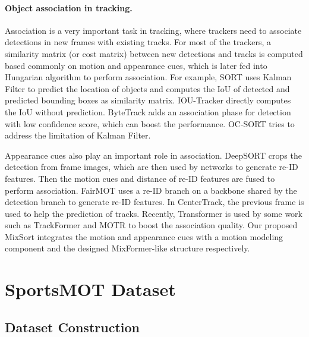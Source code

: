 \documentclass[10pt,twocolumn,letterpaper]{article}
\begin{document}
\vspace{-4mm}
\paragraph{Object association in tracking.}
Association is a very important task in tracking, where trackers need to associate detections in new frames with existing tracks. For most of the trackers, a similarity matrix (or cost matrix) between new detections and tracks is computed based commonly on motion and appearance cues, which is later fed into Hungarian algorithm\cite{kuhn1955hungarian} to perform association. For example, SORT\cite{bewley2016simple} uses Kalman Filter to predict the location of objects and computes the IoU of detected and predicted bounding boxes as similarity matrix. IOU-Tracker\cite{bochinski2017high} directly computes the IoU without prediction. ByteTrack\cite{zhang2022bytetrack} adds an association phase for detection with low confidence score, which can boost the performance. OC-SORT\cite{cao2022observation} tries to address the limitation of Kalman Filter.

Appearance cues also play an important role in association. DeepSORT\cite{wojke2017simple} crops the detection from frame images, which are then used by networks to generate re-ID features. Then the motion cues and distance of re-ID features are fused to perform association. FairMOT\cite{zhang2021fairmot} uses a re-ID branch on a backbone shared by the detection branch to generate re-ID features. In CenterTrack\cite{zhou2020tracking}, the previous frame is used to help the prediction of tracks. Recently, Transformer\cite{vaswani2017attention} is used by some work such as TrackFormer\cite{meinhardt2022trackformer} and MOTR\cite{zeng2022motr} to boost the association quality.
Our proposed MixSort integrates the motion and appearance cues with a motion modeling component and the designed MixFormer-like structure respectively.

\section{SportsMOT Dataset}

\subsection{Dataset Construction}
\end{document}
